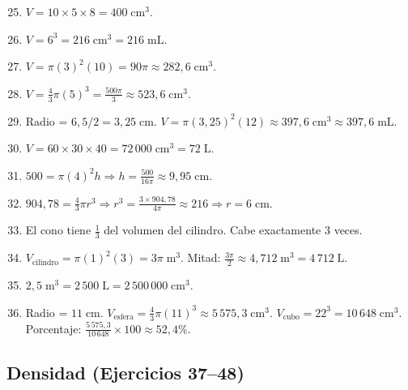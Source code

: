 \documentclass[12pt, letterpaper]{article}
\begin{document}
  \begin{enumerate}[leftmargin=*, label=\textbf{\arabic*.}]
    \setcounter{enumi}{24}
    \item $V = 10 \times 5 \times 8 = 400\;\text{cm}^3$.

    \item $V = 6^3 = 216\;\text{cm}^3 = 216\;\text{mL}$.

    \item $V = \pi (3)^2 (10) = 90\pi \approx 282{,}6\;\text{cm}^3$.

    \item $V = \frac{4}{3}\pi (5)^3 = \frac{500\pi}{3} \approx 523{,}6\;\text{cm}^3$.

    \item Radio = $6{,}5/2 = 3{,}25\;\text{cm}$. $V = \pi(3{,}25)^2(12) \approx 397{,}6\;\text{cm}^3 \approx 397{,}6\;\text{mL}$.

    \item $V = 60 \times 30 \times 40 = 72\,000\;\text{cm}^3 = 72\;\text{L}$.

    \item $500 = \pi(4)^2 h \Rightarrow h = \frac{500}{16\pi} \approx 9{,}95\;\text{cm}$.

    \item $904{,}78 = \frac{4}{3}\pi r^3 \Rightarrow r^3 = \frac{3 \times 904{,}78}{4\pi} \approx 216 \Rightarrow r = 6\;\text{cm}$.

    \item El cono tiene $\frac{1}{3}$ del volumen del cilindro. Cabe exactamente 3 veces.

    \item $V_{\text{cilindro}} = \pi(1)^2(3) = 3\pi\;\text{m}^3$. Mitad: $\frac{3\pi}{2} \approx 4{,}712\;\text{m}^3 = 4\,712\;\text{L}$.

    \item $2{,}5\;\text{m}^3 = 2\,500\;\text{L} = 2\,500\,000\;\text{cm}^3$.

    \item Radio = $11\;\text{cm}$. $V_{\text{esfera}} = \frac{4}{3}\pi(11)^3 \approx 5\,575{,}3\;\text{cm}^3$. $V_{\text{cubo}} = 22^3 = 10\,648\;\text{cm}^3$. Porcentaje: $\frac{5\,575{,}3}{10\,648} \times 100 \approx 52{,}4\%$.
  \end{enumerate}

  \subsection*{Densidad (Ejercicios 37--48)}
\end{document}
